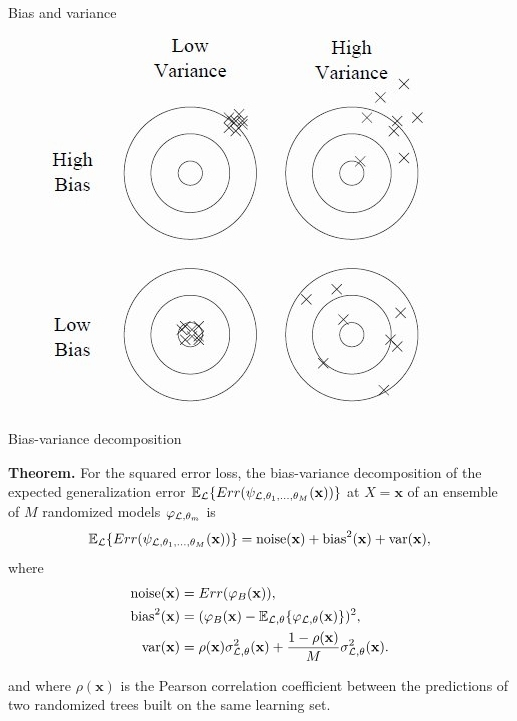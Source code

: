 \documentclass{beamer}
\begin{document}
\begin{frame}{Bias and variance}
    \begin{figure}
        \includegraphics[scale=0.7]{./figures/bias-variance-darts.jpg}
    \end{figure}
\end{frame}

\begin{frame}{Bias-variance decomposition}

{\bf Theorem.}
For the squared error loss, the bias-variance decomposition of the expected
generalization error $\mathbb{E}_{\cal L} \{ Err( \psi_{{\cal L},\theta_1,\dots,\theta_M}(\mathbf{x}))
\}$ at $X=\mathbf{x}$ of an ensemble of $M$ randomized models $\varphi_{{\cal L},\theta_m}$ is
\begin{equation*}
\mathbb{E}_{\cal L} \{ Err(\psi_{{\cal L},\theta_1,\dots,\theta_M}(\mathbf{x})) \} = \text{noise}(\mathbf{x}) + \text{bias}^2(\mathbf{x}) + \text{var}(\mathbf{x}),
\end{equation*}
where
\begin{align*}
\text{noise}(\mathbf{x}) &= Err(\varphi_B(\mathbf{x})), \\
\text{bias}^2(\mathbf{x}) &= (\varphi_B(\mathbf{x}) - \mathbb{E}_{{\cal L},\theta} \{ \varphi_{{\cal L},\theta}(\mathbf{x}) \} )^2, \\
\text{var}(\mathbf{x}) &= \rho(\mathbf{x}) \sigma^2_{{\cal L},\theta}(\mathbf{x}) + \frac{1 - \rho(\mathbf{x})}{M} \sigma^2_{{\cal L},\theta}(\mathbf{x}).
\end{align*}

and where $\rho(\mathbf{x})$ is the Pearson correlation coefficient between
the predictions of two randomized trees built on the same learning set.

\end{frame}
\end{document}
